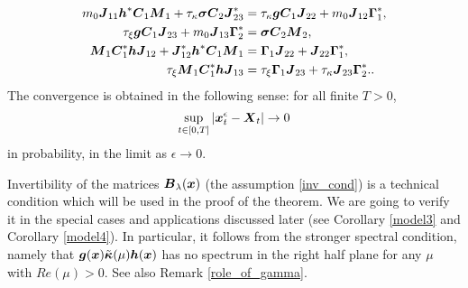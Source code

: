 \begin{theorem}
\begin{align}
m_0 \boldsymbol{J}_{11} \boldsymbol{h}^* \boldsymbol{C}_1 \boldsymbol{M}_1 + \tau_{\kappa} \boldsymbol{\sigma} \boldsymbol{C}_2 \boldsymbol{J}_{23}^* &= \tau_{\kappa} \boldsymbol{g} \boldsymbol{C}_1 \boldsymbol{J}_{22} + m_0 \boldsymbol{J}_{12} \boldsymbol{\Gamma}_1^*,\\
\tau_{\xi} \boldsymbol{g} \boldsymbol{C}_1 \boldsymbol{J}_{23} + m_0 \boldsymbol{J}_{13} \boldsymbol{\Gamma}_2^* &= \boldsymbol{\sigma} \boldsymbol{C}_2 \boldsymbol{M}_2,  \\ 
\boldsymbol{M}_1 \boldsymbol{C}_1^* \boldsymbol{h} \boldsymbol{J}_{12} + \boldsymbol{J}_{12}^* \boldsymbol{h}^* \boldsymbol{C}_1 \boldsymbol{M}_1 &= \boldsymbol{\Gamma}_1 \boldsymbol{J}_{22} + \boldsymbol{J}_{22} \boldsymbol{\Gamma}_1^*, \\
\tau_{\xi} \boldsymbol{M}_1 \boldsymbol{C}_1^* \boldsymbol{h} \boldsymbol{J}_{13} &= \tau_{\xi} \boldsymbol{\Gamma}_1 \boldsymbol{J}_{23} + \tau_{\kappa} \boldsymbol{J}_{23} \boldsymbol{\Gamma}_2^*. 
. \label{gen_end} 
\end{align}
The convergence is obtained in the following sense: for all finite $T>0$, 
\begin{equation}
\sup_{t \in [0,T]}|\boldsymbol{x}_t^\epsilon - \boldsymbol{X}_t| \to 0
\end{equation}
in probability, in the limit as $\epsilon \to 0$.
\end{theorem}


\begin{remark}
Invertibility of the matrices $\boldsymbol{B}_\lambda(\boldsymbol{x})$ (the assumption \eqref{inv_cond}) is a technical condition which will be used in the proof of the theorem.  We are going to verify it in the special cases and applications discussed later (see Corollary \ref{model3} and Corollary \ref{model4}).  In particular, it follows from the stronger spectral condition, namely that
$\boldsymbol{g}(\boldsymbol{x})\tilde{\boldsymbol{\kappa}}(\mu)\boldsymbol{h}(\boldsymbol{x})$ has no spectrum in the right half plane for any $\mu$ with $Re(\mu) > 0$.   See also Remark \ref{role_of_gamma}.
\end{remark}

